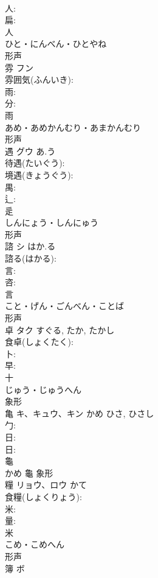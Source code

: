 \documentclass[8pt]{extreport}
\begin{document}
\begin{CJK}{UTF8}{min}
\\	人: 
\\	扁: 
\\	人	
\\	ひと・にんべん・ひとやね	
\\	形声 
\\	雰	フン			
\\	雰囲気(ふんいき): 
\\	雨: 
\\	分: 
\\	雨	
\\	あめ・あめかんむり・あまかんむり	
\\	形声 
\\	遇	グウ	あ.う		
\\	待遇(たいぐう): 
\\	境遇(きょうぐう): 
\\	禺: 
\\	辶: 
\\	辵	
\\	しんにょう・しんにゅう	
\\	形声 
\\	諮	シ	はか.る		
\\	諮る(はかる): 
\\	言: 
\\	咨: 
\\	言	
\\	こと・げん・ごんべん・ことば	
\\	形声 
\\	卓	タク		すぐる, たか, たかし	
\\	食卓(しょくたく): 
\\	卜: 
\\	早: 
\\	十	
\\	じゅう・じゅうへん	
\\	象形 
\\	亀	キ、キュウ、キン	かめ	ひさ, ひさし	
\\	勹: 
\\	日: 
\\	日: 
\\	龜	
\\	かめ	龜	象形 
\\	糧	リョウ、ロウ	かて		
\\	食糧(しょくりょう): 
\\	米: 
\\	量: 
\\	米	
\\	こめ・こめへん	
\\	形声 
\\	簿	ボ			

\end{CJK}
\end{document}
